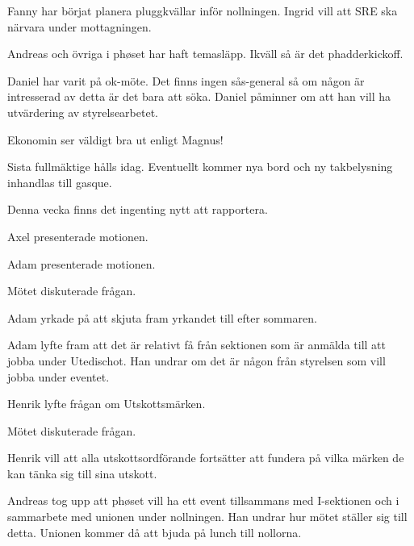 \documentclass[10pt]{article}
\begin{document}
\begin{paragrafer}
\begin{paragrafer}
		Fanny har börjat planera pluggkvällar inför nollningen. Ingrid vill att SRE ska närvara under mottagningen.

		Andreas och övriga i phøset har haft temasläpp. Ikväll så är det phadderkickoff.

		Daniel har varit på ok-möte. Det finns ingen sås-general så om någon är intresserad av detta är det bara att söka. Daniel påminner om att han vill ha utvärdering av styrelsearbetet.

		Ekonomin ser väldigt bra ut enligt Magnus!
		
		
		Sista fullmäktige hålls idag. Eventuellt kommer nya bord och ny takbelysning inhandlas till gasque. 

		
		Denna vecka finns det ingenting nytt att rapportera.
		
		
	\end{paragrafer}
	
	Axel presenterade motionen.

	\Mbaby


	Adam presenterade motionen.

	Mötet diskuterade frågan.

	Adam yrkade på att skjuta fram yrkandet till efter sommaren.

	\Mbaby

	
	Adam lyfte fram att det är relativt få från sektionen som är anmälda till att jobba under Utedischot. Han undrar om det är någon från styrelsen som vill jobba under eventet.

  
	Henrik lyfte frågan om Utskottsmärken.

	Mötet diskuterade frågan.

	Henrik vill att alla utskottsordförande fortsätter att fundera på vilka märken de kan tänka sig till sina utskott. 

	
	Andreas tog upp att phøset vill ha ett event tillsammans med I-sektionen och i sammarbete med unionen under nollningen. Han undrar hur mötet ställer sig till detta. Unionen kommer då att bjuda på lunch till nollorna.
	

\end{paragrafer}
\end{document}
